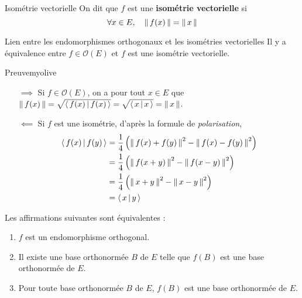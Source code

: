    \begin{defi}{Isométrie vectorielle}{}
        On dit que $f$ est une \textbf{isométrie vectorielle} si 
        \[ \forall x \in E, \quad \left\lVert\,f(x)\,\right\rVert = \left\lVert\,x\,\right\rVert \]   
    \end{defi}

    \begin{prop}{Lien entre les endomorphismes orthogonaux et les isométries vectorielles}{}
        Il y a équivalence entre $f \in \mathcal{O}(E)$ et $f$ est une isométrie vectorielle.
    \end{prop}

    \begin{demo}{Preuve}{myolive}
        \begin{itemize}
            \item[$\implies$] Si $f \in \mathcal{O}(E)$, on a pour tout $x \in E$ que $\left\lVert\,f(x)\,\right\rVert = \sqrt{\left<\,f(x)\,\middle|\,f(x)\,\right>} = \sqrt{\left<\,x\,\middle|\,x\,\right>} = \left\lVert\,x\,\right\rVert$.
            \item[$\impliedby$] Si $f$ est une isométrie, d’après la formule de \textit{polarisation}, 
            \begin{align*}
                \left<\,f(x)\,\middle|\,f(y)\,\right> 
                &= \frac{1}{4} \left(\left\lVert\,f(x) + f(y)\,\right\rVert^2 - \left\lVert\,f(x)-f(y)\,\right\rVert^2\right) \\
                &= \frac{1}{4} \left(\left\lVert\,f(x + y)\,\right\rVert^2 - \left\lVert\,f(x-y)\,\right\rVert^2\right) \\
                &= \frac{1}{4} \left(\left\lVert\,x+y\,\right\rVert^2 - \left\lVert\,x-y\,\right\rVert^2\right) \\
                &= \left<\,x\,\middle|\,y\,\right> 
            \end{align*}
        \end{itemize}
    \end{demo}

    \begin{prop}{}{}
        Les affirmations suivantes sont équivalentes :
        \begin{enumerate}
            \item $f$ est un endomorphisme orthogonal.
            \item Il existe une base orthonormée $B$ de $E$ telle que $f(B)$ est une base orthonormée de $E$.
            \item Pour toute base orthonormée $B$ de $E$, $f(B)$ est une base orthonormée de $E$.
        \end{enumerate}
    \end{prop}

